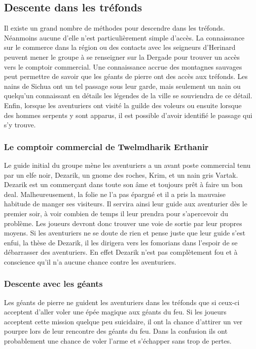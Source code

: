 \subsection*{Descente dans les tréfonds}

Il existe un grand nombre de méthodes pour descendre dans les tréfonds. Néanmoins
aucune d'elle n'est particulièrement simple d'accès. La connaissance sur le commerce
dans la région ou des contacts avec les seigneurs d'Herinard peuvent mener le groupe 
à se renseigner sur la Dergade pour trouver un accès vers le comptoir commercial. Une
connaissance accrue des montagnes sauvages peut permettre de savoir que les géants de 
pierre ont des accès aux tréfonds. Les nains de Sichua ont un tel passage sous leur 
garde, mais seulement un nain ou quelqu'un connaissant en détails les légendes de la 
ville se souviendra de ce détail. Enfin, lorsque les aventuriers ont visité la guilde des
voleurs ou ensuite lorsque des hommes serpents y sont apparus, il est possible d'avoir 
identifié le passage qui s'y trouve.


\subsubsection*{Le comptoir commercial de Twelmdharik Erthanir}

Le guide initial du groupe mène les aventuriers a un avant poste commercial tenu par 
un elfe noir, Dezarik, un gnome des roches, Krim, et un nain gris Vartak. Dezarik est 
un commerçant dans toute son âme et toujours prêt à faire un bon deal. Malheureusement, 
la folie ne l'a pas épargné et il a pris la mauvaise habitude de manger ses visiteurs. 
Il servira ainsi leur guide aux aventurier dès le premier soir, à voir combien de temps 
il leur prendra pour s'apercevoir du problème. Les joueurs devront donc trouver une 
voie de sortie par leur propres moyens. Si les aventuriers ne se doute de rien et pense 
juste que leur guide s'est enfui, la thèse de Dezarik, il les dirigera vers les 
fomorians dans l'espoir de se débarrasser des aventuriers. En effet Dezarik n'est pas 
complètement fou et à conscience qu'il n'a aucune chance contre les aventuriers. 

\subsubsection{Descente avec les géants}

Les géants de pierre ne guident les aventuriers dans les tréfonds que si ceux-ci
acceptent d'aller voler une épée magique aux géants du feu. Si les joueurs acceptent
cette mission quelque peu suicidaire, il ont la chance d'attirer un ver pourpre lors 
de leur rencontre des géants du feu. Dans la confusion ils ont probablement une chance 
de voler l'arme et s'échapper sans trop de pertes.

